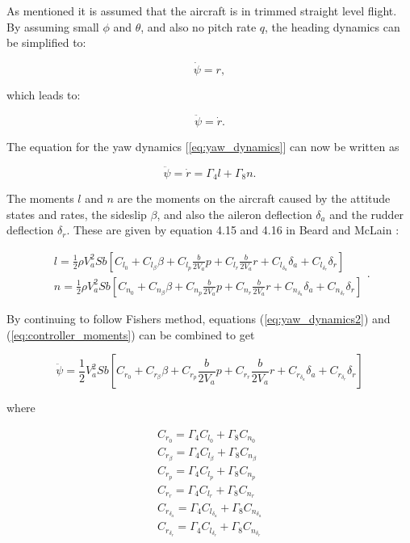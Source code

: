 As mentioned it is assumed that the aircraft is in trimmed straight level flight. By assuming small $\phi$ and $\theta$, and also no pitch rate $q$, the heading dynamics can be simplified to:

\begin{equation}
	\dot{\psi} = r,
\end{equation}

which leads to:

\begin{equation}
	\ddot{\psi} = \dot{r}.
\end{equation}

The equation for the yaw dynamics [\ref{eq:yaw_dynamics}] can now be written as

\begin{equation}
	\label{eq:yaw_dynamics2}
	\ddot{\psi} = \dot{r} = \Gamma_4l + \Gamma_8n.
\end{equation}

The moments $l$ and $n$ are the moments on the aircraft caused by the attitude states and rates, the sideslip $\beta$, and also the aileron deflection $\delta_a$ and the rudder deflection $\delta_r$. These are given by equation 4.15 and 4.16 in Beard and McLain \cite{suaBEARD}:

\begin{equation}
\begin{gathered}
	\label{eq:controller_moments}
	l = \frac{1}{2} \rho V_a^2Sb[C_{l_0} + C_{l_\beta}\beta + C_{l_p}\frac{b}{2V_a}p + C_{l_r}\frac{b}{2V_a}r + C_{l_{\delta_a}}\delta_a + C_{l_{\delta_r}}\delta_r]
	\\
	n = \frac{1}{2} \rho V_a^2Sb[C_{n_0} + C_{n_\beta}\beta + C_{n_p}\frac{b}{2V_a}p + C_{n_r}\frac{b}{2V_a}r + C_{n_{\delta_a}}\delta_a + C_{n_{\delta_r}}\delta_r]
\end{gathered}
.
\end{equation}

By continuing to follow Fishers \cite{ratcFISHER} method, equations (\ref{eq:yaw_dynamics2}) and (\ref{eq:controller_moments}) can be combined to get

\begin{equation}
	\label{eq:yaw_dynamics_final}
	\ddot{\psi} = \frac{1}{2}V_a^2Sb[C_{r_0} + C_{r_\beta}\beta + C_{r_p}\frac{b}{2V_a}p + C_{r_r}\frac{b}{2V_a}r + C_{r_{\delta_a}}\delta_a + C_{r_{\delta_r}}\delta_r]
\end{equation}

where

\begin{equation}
\begin{gathered}
	C_{r_0} = \Gamma_4C_{l_0} + \Gamma_8C_{n_0}
	\\
	C_{r_\beta} = \Gamma_4C_{l_\beta} + \Gamma_8C_{n_\beta}
	\\
	C_{r_p} = \Gamma_4C_{l_p} + \Gamma_8C_{n_p}
	\\
	C_{r_r} = \Gamma_4C_{l_r} + \Gamma_8C_{n_r}
	\\
	C_{r_{\delta_a}} = \Gamma_4C_{l_{\delta_a}} + \Gamma_8C_{n_{\delta_a}}
	\\
	C_{r_{\delta_r}} = \Gamma_4C_{l_{\delta_r}} + \Gamma_8C_{n_{\delta_r}}
\end{gathered}
\end{equation}

